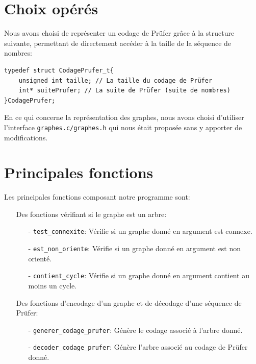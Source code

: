 \documentclass[a4paper, 11pt, oneside]{article}
\begin{document}
\section{Choix opérés}

Nous avons choisi de représenter un codage de Prüfer grâce à la structure suivante, permettant de directement accéder à la taille de la séquence de nombres: 

\begin{lstlisting}
typedef struct CodagePrufer_t{
	unsigned int taille; // La taille du codage de Prüfer
	int* suitePrufer; // La suite de Prüfer (suite de nombres)
}CodagePrufer;
\end{lstlisting}

En ce qui concerne la représentation des graphes, nous avons choisi d'utiliser l'interface \texttt{graphes.c/graphes.h} qui nous était proposée sans y apporter de modifications.

\section{Principales fonctions}

Les principales fonctions composant notre programme sont:\\

\begin{itemize}

\item[\textbullet] Des fonctions vérifiant si le graphe est un arbre:\\

\begin{itemize}

	\item[-] \texttt{test\_connexite}: Vérifie si un graphe donné en argument est connexe.
	
	\item[-] \texttt{est\_non\_oriente}: Vérifie si un graphe donné en argument est non orienté.

	\item[-] \texttt{contient\_cycle}: Vérifie si un graphe donné en argument contient au moins un cycle.\\

\end{itemize}

\item[\textbullet] Des fonctions d'encodage d'un graphe et de décodage d'une séquence de Prüfer:\\

\begin{itemize}

	\item[-] \texttt{generer\_codage\_prufer}: Génère le codage associé à l'arbre donné.
	
	\item[-] \texttt{decoder\_codage\_prufer}: Génère l'arbre associé au codage de Prüfer donné.

\end{itemize}

\end{itemize}
\end{document}
